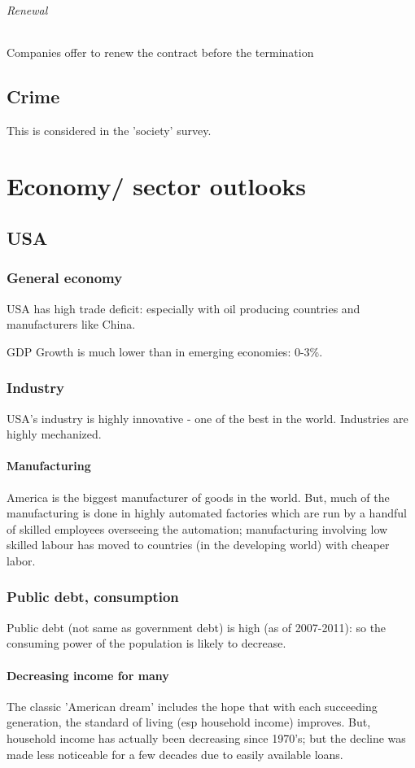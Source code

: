 \documentclass[oneside, article]{memoir}
\begin{document}
\paragraph{Renewal}
Companies offer to renew the contract before the termination \tbc

\chapter{Crime}
This is considered in the 'society' survey.

\part{Economy/ sector outlooks}
\chapter{USA}
\section{General economy}
USA has high trade deficit: especially with oil producing countries and manufacturers like China.

GDP Growth is much lower than in emerging economies: 0-3\%.

\section{Industry}
USA's industry is highly innovative - one of the best in the world. Industries are highly mechanized.

\subsection{Manufacturing}
America is the biggest manufacturer of goods in the world. But, much of the manufacturing is done in highly automated factories which are run by a handful of skilled employees overseeing the automation; manufacturing involving low skilled labour has moved to countries (in the developing world) with cheaper labor.

\section{Public debt, consumption}
Public debt (not same as government debt) is high (as of 2007-2011): so the consuming power of the population is likely to decrease.

\subsection{Decreasing income for many}
The classic 'American dream' includes the hope that with each succeeding generation, the standard of living (esp household income) improves. But, household income has actually been decreasing since 1970's; but the decline was made less noticeable for a few decades due to easily available loans.
\end{document}
